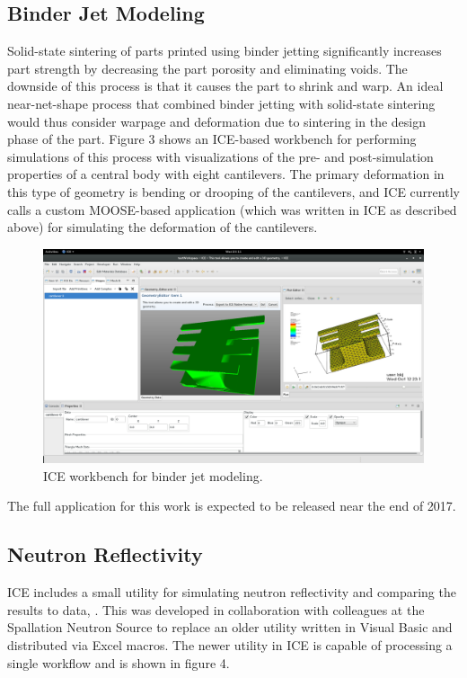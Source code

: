 \subsection{Binder Jet Modeling}\label{binder-jet-modeling}

Solid-state sintering of parts printed using binder jetting
significantly increases part strength by decreasing the part porosity
and eliminating voids. The downside of this process is that it causes
the part to shrink and warp. An ideal near-net-shape process that
combined binder jetting with solid-state sintering would thus consider
warpage and deformation due to sintering in the design phase of the
part. Figure 3 shows an ICE-based workbench for performing simulations of
this process with visualizations of the pre- and post-simulation
properties of a central body with eight cantilevers. The primary
deformation in this type of geometry is bending or drooping of the
cantilevers, and ICE currently calls a custom MOOSE-based application
(which was written in ICE as described above) for simulating the
deformation of the cantilevers.

\begin{figure}[htbp]
\centering
\includegraphics[width=\textwidth]{images/ice-bjm.png}
\caption{ICE workbench for binder jet modeling.}
\end{figure}

The full application for this work is expected to be released near the
end of 2017.

\subsection{Neutron Reflectivity}\label{neutron-reflectivity}

ICE includes a small utility for simulating neutron reflectivity and
comparing the results to data, \cite{billings_brand_2015}. This was developed
in collaboration with colleagues at the Spallation Neutron Source to
replace an older utility written in Visual Basic and distributed via
Excel macros. The newer utility in ICE is capable of processing a single
workflow and is shown in figure 4.

